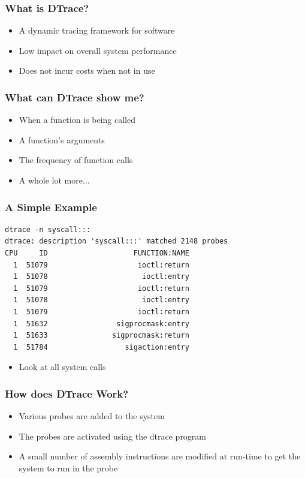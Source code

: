 \documentclass[pdftex]{beamer} %
\begin{document}
\begin{frame}
  \frametitle{What is DTrace?}
  \begin{itemize}
  \item A dynamic tracing framework for software
  \item Low impact on overall system performance
  \item Does not incur costs when not in use
  \end{itemize}
\end{frame}

\begin{frame}
  \frametitle{What can DTrace show me?}
  \begin{itemize}
  \item When a function is being called
  \item A function's arguments
  \item The frequency of function calls
  \item A whole lot more...
  \end{itemize}
\end{frame}

\begin{frame}[fragile]
  \frametitle{A Simple Example}
  \begin{lstlisting}
dtrace -n syscall:::
dtrace: description 'syscall:::' matched 2148 probes
CPU     ID                    FUNCTION:NAME
  1  51079                     ioctl:return 
  1  51078                      ioctl:entry 
  1  51079                     ioctl:return 
  1  51078                      ioctl:entry 
  1  51079                     ioctl:return 
  1  51632                sigprocmask:entry 
  1  51633               sigprocmask:return 
  1  51784                  sigaction:entry 
  \end{lstlisting}
  \begin{itemize}
  \item Look at all system calls
  \end{itemize}
\end{frame}

\begin{frame}
  \frametitle{How does DTrace Work?}
  \begin{itemize}
  \item Various probes are added to the system
  \item The probes are activated using the dtrace program
  \item A small number of assembly instructions are modified at
    run-time to get the system to run in the probe
  \end{itemize}
\end{frame}
\end{document}
